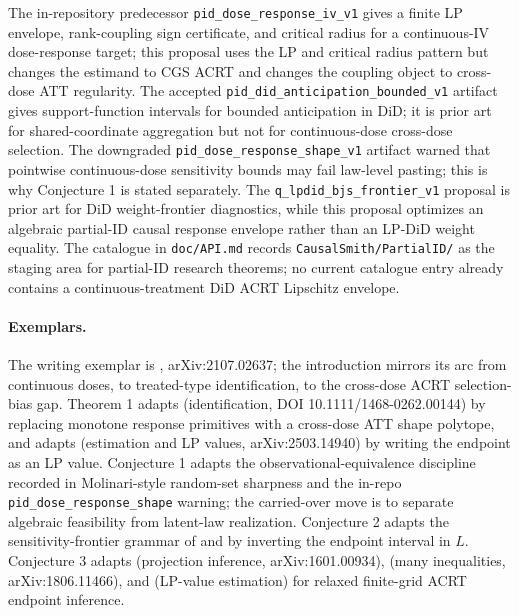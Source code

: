 \documentclass[11pt]{article}
\theoremstyle{definition}
\theoremstyle{plain}
\theoremstyle{remark}
\begin{document}
The in-repository predecessor \texttt{pid\_dose\_response\_iv\_v1} gives a
finite LP envelope, rank-coupling sign certificate, and critical radius for a
continuous-IV dose-response target; this proposal uses the LP and critical
radius pattern but changes the estimand to CGS ACRT and changes the coupling
object to cross-dose ATT regularity.  The accepted
\texttt{pid\_did\_anticipation\_bounded\_v1} artifact gives support-function
intervals for bounded anticipation in DiD; it is prior art for shared-coordinate
aggregation but not for continuous-dose cross-dose selection.  The downgraded
\texttt{pid\_dose\_response\_shape\_v1} artifact warned that pointwise
continuous-dose sensitivity bounds may fail law-level pasting; this is why
Conjecture 1 is stated separately.  The \texttt{q\_lpdid\_bjs\_frontier\_v1}
proposal is prior art for DiD weight-frontier diagnostics, while this proposal
optimizes an algebraic partial-ID causal response envelope rather than an LP-DiD weight
equality.  The catalogue in \texttt{doc/API.md} records \texttt{CausalSmith/PartialID/}
as the staging area for partial-ID research theorems; no current catalogue
entry already contains a continuous-treatment DiD ACRT Lipschitz envelope.

\paragraph{Exemplars.}
The writing exemplar is \citet{CallawayGoodmanBaconSantAnna2021},
arXiv:2107.02637; the introduction mirrors its arc from continuous doses, to
treated-type identification, to the cross-dose ACRT selection-bias gap.
Theorem 1 adapts \citet{ManskiPepper2000} (identification, DOI
10.1111/1468-0262.00144) by replacing monotone response primitives with a
cross-dose ATT shape polytope, and adapts \citet{Voronin2025} (estimation and
LP values, arXiv:2503.14940) by writing the endpoint as an LP value.
Conjecture 1 adapts the observational-equivalence discipline recorded in
Molinari-style random-set sharpness and the in-repo \texttt{pid\_dose\_response\_shape}
warning; the carried-over move is to separate algebraic feasibility from
latent-law realization.  Conjecture 2 adapts the sensitivity-frontier grammar
of \citet{ChernozhukovLeeRosen2013} and \citet{Stoye2020} by inverting the
endpoint interval in \(L\).  Conjecture 3 adapts \citet{KaidoMolinariStoye2019}
(projection inference, arXiv:1601.00934), \citet{BelloniBugniChernozhukov2018}
(many inequalities, arXiv:1806.11466), and \citet{Voronin2025} (LP-value
estimation) for relaxed finite-grid ACRT endpoint inference.
\end{document}
